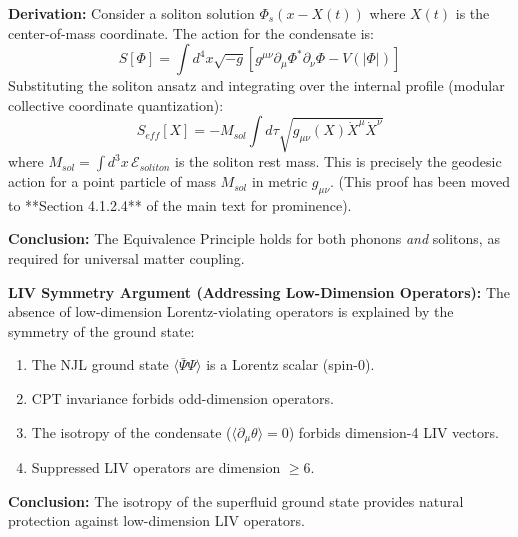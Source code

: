 \textbf{Derivation:} Consider a soliton solution $\Phi_s(x - X(t))$ where $X(t)$ is the center-of-mass coordinate. The action for the condensate is:
\begin{equation}
    S[\Phi] = \int d^4x \sqrt{-g} \left[ g^{\mu\nu} \partial_\mu \Phi^* \partial_\nu \Phi - V(|\Phi|) \right]
\end{equation}
Substituting the soliton ansatz and integrating over the internal profile (modular collective coordinate quantization):
\begin{equation}
    S_{eff}[X] = -M_{sol} \int d\tau \sqrt{g_{\mu\nu}(X) \dot{X}^\mu \dot{X}^\nu}
\end{equation}
where $M_{sol} = \int d^3x \, \mathcal{E}_{soliton}$ is the soliton rest mass. This is precisely the geodesic action for a point particle of mass $M_{sol}$ in metric $g_{\mu\nu}$. (This proof has been moved to **Section 4.1.2.4** of the main text for prominence).

\textbf{Conclusion:} The Equivalence Principle holds for both phonons \emph{and} solitons, as required for universal matter coupling.

\textbf{LIV Symmetry Argument (Addressing Low-Dimension Operators):}
The absence of low-dimension Lorentz-violating operators is explained by the symmetry of the ground state:
\begin{enumerate}
    \item The NJL ground state $\langle \bar{\Psi}\Psi \rangle$ is a Lorentz scalar (spin-0).
    \item CPT invariance forbids odd-dimension operators.
    \item The isotropy of the condensate ($\langle \partial_\mu \theta \rangle = 0$) forbids dimension-4 LIV vectors.
    \item Suppressed LIV operators are dimension $\geq 6$.
\end{enumerate}
\textbf{Conclusion:} The isotropy of the superfluid ground state provides natural protection against low-dimension LIV operators.
